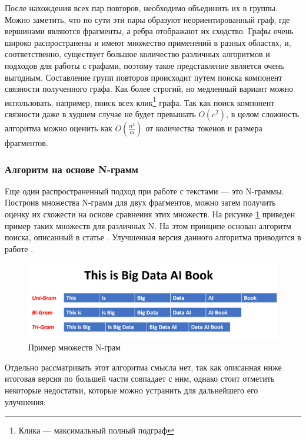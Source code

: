 \documentclass[14pt]{matmex-diploma-custom}
\begin{document}
После нахождения всех пар повторов, необходимо объединить их в группы. Можно заметить, что по сути эти пары образуют неориентированный граф, где вершинами являются фрагменты, а ребра отображают их сходство. Графы очень широко распространены и имеют множество применений в разных областях, и, соответственно, существует большое количество различных алгоритмов и подходов для работы с графами, поэтому такое представление является очень выгодным. Составление групп повторов происходит путем поиска компонент связности полученного графа. Как более строгий, но медленный вариант можно использовать, например, поиск всех клик\footnote{Клика --- максимальный полный подграф} графа. Так как поиск компонент связности даже в худшем случае не будет превышать $O(c^2)$, в целом сложность алгоритма можно оценить как $O(\frac{n^2}{m})$ от количества токенов и размера фрагментов.

\subsubsection{Алгоритм на основе N-грамм}

Еще один распространенный подход при работе с текстами --- это N-граммы\cite{bib:art:Ngram}. Построив множества N-грамм для двух фрагментов, можно затем получить оценку их схожести на основе сравнения этих множеств. На рисунке \ref{fig:Ngram} приведен пример таких множеств для различных N. На этом принципе основан алгоритм поиска, описанный в статье \cite{bib:tool:NgramSearch}. Улучшенная версия данного алгоритма приводится в работе \cite{bib:tool:ImprovedNgramSearch}.

\begin{figure}[h!]
	\includegraphics[scale=0.37]{pictures/Ngram.png}
	\centering
	\caption{Пример множеств N-грам}
	\label{fig:Ngram}
\end{figure}

Отдельно рассматривать этот алгоритма смысла нет, так как описанная ниже итоговая версия по большей части совпадает с ним, однако стоит отметить некоторые недостатки, которые можно устранить для дальнейшего его улучшения:
\end{document}
